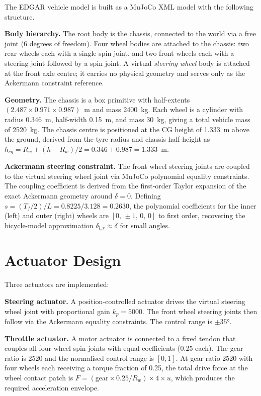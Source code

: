 \documentclass[a4paper,12pt]{report}
\begin{document}
The EDGAR vehicle model is built as a MuJoCo XML model with the following
structure.

\textbf{Body hierarchy.} The root body is the chassis, connected to the world
via a free joint (6 degrees of freedom). Four wheel bodies are attached to the
chassis: two rear wheels each with a single spin joint, and two front wheels
each with a steering joint followed by a spin joint. A virtual \emph{steering
wheel} body is attached at the front axle centre; it carries no physical
geometry and serves only as the Ackermann constraint reference.

\textbf{Geometry.} The chassis is a box primitive with half-extents
$(2.487 \times 0.971 \times 0.987)$~m and mass 2400~kg. Each wheel is a
cylinder with radius 0.346~m, half-width 0.15~m, and mass 30~kg, giving a
total vehicle mass of 2520~kg. The chassis centre is positioned at the CG
height of 1.333~m above the ground, derived from the tyre radius and chassis
half-height as $h_{cg} = R_w + (h - R_w)/2 = 0.346 + 0.987 = 1.333$~m.

\textbf{Ackermann steering constraint.} The front wheel steering joints are
coupled to the virtual steering wheel joint via MuJoCo polynomial equality
constraints. The coupling coefficient is derived from the first-order Taylor
expansion of the exact Ackermann geometry around $\delta = 0$. Defining
$s = (T_f/2)/L = 0.8225/3.128 = 0.2630$, the polynomial coefficients for the
inner (left) and outer (right) wheels are $[0,\, \pm 1,\, 0,\, 0]$ to first
order, recovering the bicycle-model approximation $\delta_{l,r} \approx \delta$
for small angles.

\section{Actuator Design}

Three actuators are implemented:

\textbf{Steering actuator.} A position-controlled actuator drives the virtual
steering wheel joint with proportional gain $k_p = 5000$. The front wheel
steering joints then follow via the Ackermann equality constraints. The control
range is $\pm 35°$.

\textbf{Throttle actuator.} A motor actuator is connected to a fixed tendon
that couples all four wheel spin joints with equal coefficients (0.25 each).
The gear ratio is 2520 and the normalised control range is $[0, 1]$. At gear
ratio 2520 with four wheels each receiving a torque fraction of 0.25, the total
drive force at the wheel contact patch is
$F = (\text{gear} \times 0.25 / R_w) \times 4 \times u$,
which produces the required acceleration envelope.
\end{document}
